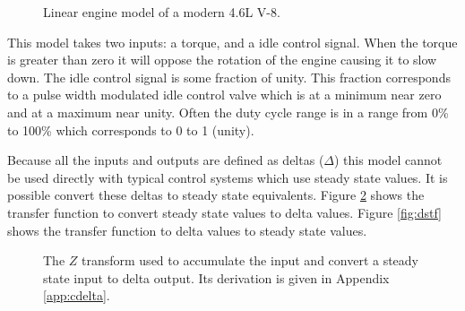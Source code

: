 \documentclass{article}
\begin{document}
\begin{figure}[hbp!]
\begin{center}


\end{center}
\caption{Linear engine model of a modern 4.6L V-8.}\label{fig:lem}
\end{figure}

This model takes two inputs: a torque, and a idle control signal.
When the torque is greater than zero it will oppose the rotation of
the engine causing it to slow down.
The idle control signal is some fraction of unity.
This fraction corresponds to a pulse width modulated idle control valve
which is at a minimum near zero and at a maximum near unity.
Often the duty cycle range is in a range from 0\% to 100\% which
corresponds to 0 to 1 (unity).

Because all the inputs and outputs are defined as deltas ($\Delta$)
this model cannot be used directly with typical control systems
which use steady state values.
It is possible convert these deltas to steady state equivalents.
Figure \ref{fig:sdtf} shows the transfer function to convert steady
state values to delta values.
Figure \ref{fig:dstf} shows the transfer function to delta values
to steady state values.

\begin{figure}[!htbp]

\begin{center}
\end{center}

\caption{The $Z$ transform used to accumulate the input and convert
a steady state input to delta output.
Its derivation is given in Appendix \ref{app:cdelta}.}
\label{fig:sdtf}

\end{figure}
\end{document}
